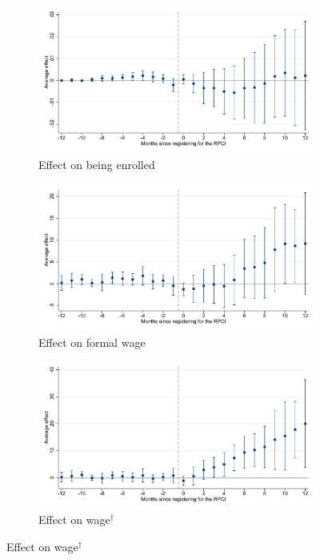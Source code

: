 \documentclass[oneside,11pt]{article}
\begin{document}
\begin{figure}[H]
    \centering
    \caption{Event studies - RPCI effect on enrollment and wages \label{fig:event_study_rpci}}
    
    \begin{subfigure}{0.49\textwidth}
    \caption{Effect on being enrolled}
    \includegraphics[width=\textwidth]{04_Figures/muestra_10porciento/event_study_alta_dcdh.pdf}
    \end{subfigure}
    
    \begin{subfigure}{0.49\textwidth}
    \caption{Effect on formal wage}
    \includegraphics[width=\textwidth]{04_Figures/muestra_10porciento/event_study_sal_formal_dcdh.pdf}
    \end{subfigure}
    \begin{subfigure}{0.49\textwidth}
    \caption{Effect on wage$^\dagger$}
    \includegraphics[width=\textwidth]{04_Figures/muestra_10porciento/event_study_sal_cierre_dcdh.pdf}
    \end{subfigure}
    
\end{figure}
\end{document}
